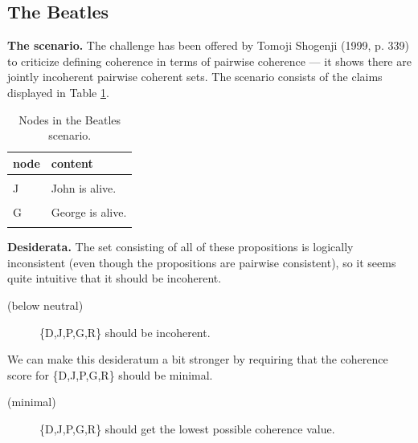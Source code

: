 \documentclass[
  10pt,
]{scrartcl}
\newcommand{\s}[1]{\textsf{#1}}
\begin{document}
\hypertarget{the-beatles}{%
\subsection{The Beatles}\label{the-beatles}}


\textbf{The scenario.} The challenge has been offered by Tomoji Shogenji (1999, p. 339) to criticize defining coherence in terms of pairwise coherence --- it shows there are jointly incoherent pairwise coherent sets. The scenario consists of the claims displayed in Table \ref{tab:beatles}.

\begin{table}[H]

\caption{\label{tab:beatles}Nodes in the Beatles scenario.}
\centering
\begin{tabular}[t]{ll}
\toprule
node & content\\
\midrule
\cellcolor{gray!6}{D} & \cellcolor{gray!6}{Exactly one of the Beatles (John, Paul, George and Ringo) is dead.}\\
J & John is alive.\\
\cellcolor{gray!6}{P} & \cellcolor{gray!6}{Paul is alive.}\\
G & George is alive.\\
\cellcolor{gray!6}{R} & \cellcolor{gray!6}{Ringo is alive.}\\
\bottomrule
\end{tabular}
\end{table}

\noindent  \textbf{Desiderata.} The set consisting of all of these propositions is logically inconsistent (even though the propositions are pairwise consistent), so it seems quite intuitive that it should be incoherent.
\vspace{2mm}

\begin{description}
    \item[(below neutral)] \{\s{D,J,P,G,R}\} should be incoherent.
\end{description}\vspace{2mm}

We can make this desideratum a bit stronger by requiring that the coherence score for \{\s{D,J,P,G,R}\} should be minimal.
\vspace{2mm}

\begin{description}
    \item[(minimal)] \{\s{D,J,P,G,R}\} should get the lowest possible coherence value.
\end{description}\vspace{2mm}
\end{document}

